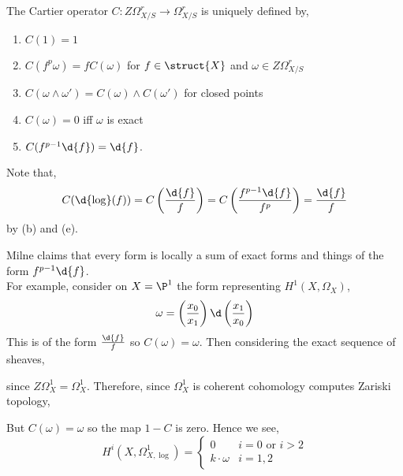 \documentclass[12pt]{article}
\begin{document}
\begin{defn}
The Cartier operator $C : Z\Omega^r_{X/S} \to \Omega^r_{X/S}$ is uniquely defined by,
\begin{enumerate}
\item $C(1) = 1$

\item $C(f^p \omega) = f C(\omega)$ for $f \in \struct{X}$ and $\omega \in Z\Omega^r_{X/S}$

\item $C(\omega \wedge \omega') = C(\omega) \wedge C(\omega')$ for closed points

\item $C(\omega) = 0$ iff $\omega$ is exact

\item $C(f^{p-1} \d{f}) = \d{f}$.
\end{enumerate}
\end{defn}

\begin{rmk}
Note that,
\[ C(\d{\log}(f)) = C \left( \frac{\d{f}}{f} \right) = C \left( \frac{f^{p-1} \d{f}}{f^p} \right) = \frac{\d{f}}{f} \]
by (b) and (e).
\end{rmk}

\begin{rmk}
Milne claims that every form is \etale locally a sum of exact forms and things of the form $f^{p-1} \d{f}$. 
\bigskip\\
For example, consider on $X = \P^1$ the form representing $H^1(X, \Omega_X)$,
\[ \omega = \left( \frac{x_0}{x_1} \right) \d \left( \frac{x_1}{x_0} \right) \]
This is of the form $\frac{\d{f}}{f}$ so $C(\omega) = \omega$. Then considering the exact sequence of \etale sheaves,
\begin{center}
\end{center}
since $Z \Omega^1_X = \Omega^1_X$. Therefore, since $\Omega^1_X$ is coherent \etale cohomology computes Zariski topology,
\begin{center}
\end{center}
But $C(\omega) = \omega$ so the map $1 - C$ is zero. Hence we see,
\[ H^i(X, \Omega^1_{X, \log}) = 
\begin{cases}
0 & i = 0 \text{ or } i > 2
\\
k \cdot \omega & i = 1, 2
\end{cases} \]
\end{rmk}
\end{document}
